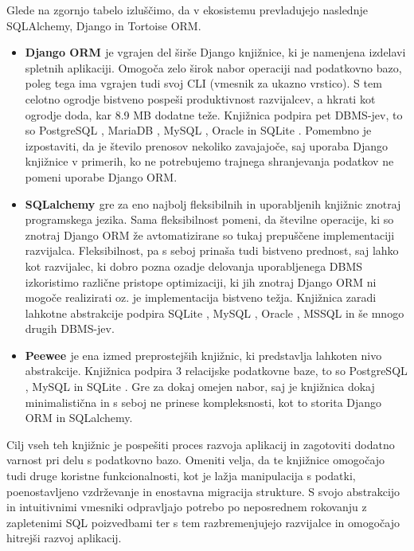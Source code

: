\documentclass[a4paper,12pt,openright]{book}
\begin{document}
    \noindent
    Glede na zgornjo tabelo izluščimo, da v ekosistemu prevladujejo naslednje SQLAlchemy, Django in Tortoise ORM.
    \begin{itemize}
        \item \textbf{Django ORM \cite{DJANGO_GITHUB}} je vgrajen del širše Django knjižnice, ki je namenjena izdelavi spletnih aplikaciji. Omogoča zelo širok nabor operaciji nad podatkovno bazo, poleg tega ima vgrajen tudi svoj CLI (vmesnik za ukazno vrstico). S tem celotno ogrodje bistveno pospeši produktivnost razvijalcev, a hkrati kot ogrodje doda, kar 8.9 MB dodatne teže. Knjižnica podpira pet DBMS-jev, to so PostgreSQL \cite{POSTGRESQL}, MariaDB \cite{MARIADB}, MySQL \cite{MYSQL}, Oracle \cite{ORACLE} in SQLite \cite{SQLITE}. Pomembno je izpostaviti, da je število prenosov nekoliko zavajajoče, saj uporaba Django knjižnice v primerih, ko ne potrebujemo trajnega shranjevanja podatkov ne pomeni uporabe Django ORM.
        \item \textbf{SQLalchemy \cite{SQLALCHEMY_GITHUB}} gre za eno najbolj fleksibilnih in uporabljenih knjižnic znotraj programskega jezika. Sama fleksibilnost pomeni, da številne operacije, ki so znotraj Django ORM že avtomatizirane so tukaj prepuščene implementaciji razvijalca. Fleksibilnost, pa s seboj prinaša tudi bistveno prednost, saj lahko kot razvijalec, ki dobro pozna ozadje delovanja uporabljenega DBMS izkoristimo različne pristope optimizaciji, ki jih znotraj Django ORM ni mogoče realizirati oz. je implementacija bistveno težja. Knjižnica zaradi lahkotne abstrakcije podpira SQLite \cite{SQLITE}, MySQL \cite{MYSQL}, Oracle \cite{ORACLE}, MSSQL \cite{MSSQL} in še mnogo drugih DBMS-jev.
        \item \textbf{Peewee \cite{PEEWEE_GITHUB}} je ena izmed preprostejših knjižnic, ki predstavlja lahkoten nivo abstrakcije. Knjižnica podpira 3 relacijske podatkovne baze, to so PostgreSQL \cite{POSTGRESQL}, MySQL \cite{MYSQL} in SQLite \cite{SQLITE}. Gre za dokaj omejen nabor, saj je knjižnica dokaj minimalistična in s seboj ne prinese kompleksnosti, kot to storita Django ORM in SQLalchemy.
    \end{itemize}

    \noindent
    Cilj vseh teh knjižnic je pospešiti proces razvoja aplikacij in zagotoviti dodatno varnost pri delu s podatkovno bazo. Omeniti velja, da te knjižnice omogočajo tudi druge koristne funkcionalnosti, kot je lažja manipulacija s podatki, poenostavljeno vzdrževanje in enostavna migracija strukture. S svojo abstrakcijo in intuitivnimi vmesniki odpravljajo potrebo po neposrednem rokovanju z zapletenimi SQL poizvedbami ter s tem razbremenjujejo razvijalce in omogočajo hitrejši razvoj aplikacij.
\end{document}
